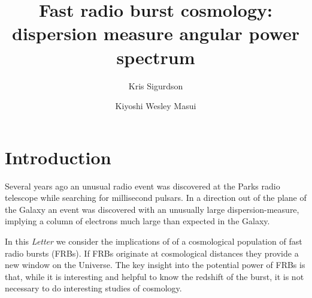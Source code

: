 \documentclass[onecolumn,prd,noshowpacs,nofootinbib,amsmath,amssymb]{revtex4}
\begin{document}
\title{Fast radio burst cosmology: dispersion measure angular power spectrum}

\author{Kris Sigurdson}

\author{Kiyoshi Wesley Masui}

\begin{abstract}

\end{abstract}

\maketitle


\section{Introduction}

Several years ago an unusual radio event was discovered at the Parks radio telescope while searching for millisecond pulsars.  In a direction out of the plane of the Galaxy an event was discovered with an unusually large dispersion-measure, implying a column of electrons much large than expected in the Galaxy.

In this \emph{Letter} we consider the implications of of a cosmological population of fast radio bursts (FRBs). 
If FRBs originate at cosmological distances they provide a new window on the Universe. The key insight into the potential power of FRBs is that, while it is interesting and helpful to know the redshift of the burst, it is not necessary to do interesting studies of cosmology.
\end{document}
